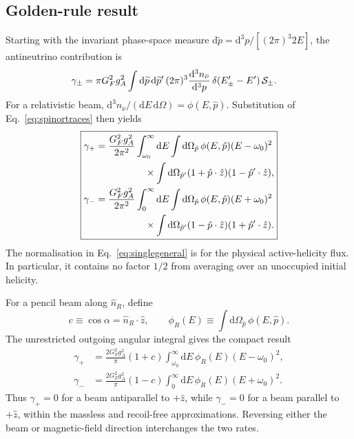 \documentclass[aps,prd,10pt,onecolumn,nofootinbib,amsmath,amssymb]{revtex4-1}
\newcommand{\dd}{\mathrm{d}}
\begin{document}
\subsection{Golden-rule result}

Starting with the invariant phase-space measure
\(\dd\widetilde p=\dd^3p/[(2\pi)^3 2E]\), the antineutrino contribution is
\begin{equation}
\begin{aligned}
 \gamma_\pm={}&
 \pi G_F^2g_A^2
 \int\dd\widetilde p\,\dd\widetilde p'\,
 (2\pi)^3\frac{\dd^3n_{\bar\nu}}{\dd^3p}\,
 \delta(E'_\pm-E')\,{\cal S}_\pm .
\end{aligned}
\label{eq:fgrphase}
\end{equation}
For a relativistic beam,
\(\dd^3n_{\bar\nu}/(\dd E\,\dd\Omega)=\phi(E,\hat p)\).
Substitution of Eq.~\eqref{eq:spinortraces} then yields
\begin{equation}
\boxed{
\begin{aligned}
 \gamma_+
 &=\frac{G_F^2g_A^2}{2\pi^2}
   \int_{\omega_0}^{\infty}\dd E\int\dd\Omega_{\hat p}\,
   \phi(E,\hat p)(E-\omega_0)^2\\
 &\hspace{18mm}\times
   \int\dd\Omega_{\hat p'}
   (1+\hat p\cdot\hat z)(1-\hat p'\cdot\hat z),\\
 \gamma_-
 &=\frac{G_F^2g_A^2}{2\pi^2}
   \int_0^{\infty}\dd E\int\dd\Omega_{\hat p}\,
   \phi(E,\hat p)(E+\omega_0)^2\\
 &\hspace{18mm}\times
   \int\dd\Omega_{\hat p'}
   (1-\hat p\cdot\hat z)(1+\hat p'\cdot\hat z).
\end{aligned}}
\label{eq:singlegeneral}
\end{equation}
The normalisation in Eq.~\eqref{eq:singlegeneral} is for the physical
active-helicity flux.  In particular, it contains no factor \(1/2\) from
averaging over an unoccupied initial helicity.

For a pencil beam along \(\hat n_R\), define
\begin{equation}
 c\equiv\cos\alpha=\hat n_R\cdot\hat z,
\qquad
 \phi_R(E)\equiv\int\dd\Omega_{\hat p}\,\phi(E,\hat p).
\end{equation}
The unrestricted outgoing angular integral gives the compact result
\begin{equation}
\boxed{
\begin{aligned}
 \gamma_+
 &=\frac{2G_F^2g_A^2}{\pi}(1+c)
   \int_{\omega_0}^{\infty}\dd E\,
   \phi_R(E)(E-\omega_0)^2,\\
 \gamma_-
 &=\frac{2G_F^2g_A^2}{\pi}(1-c)
   \int_0^{\infty}\dd E\,
   \phi_R(E)(E+\omega_0)^2.
\end{aligned}}
\label{eq:singlepencil}
\end{equation}
Thus \(\gamma_+=0\) for a beam antiparallel to \(+\hat z\), while
\(\gamma_-=0\) for a beam parallel to \(+\hat z\), within the massless and
recoil-free approximations.  Reversing either the beam or magnetic-field
direction interchanges the two rates.
\end{document}
